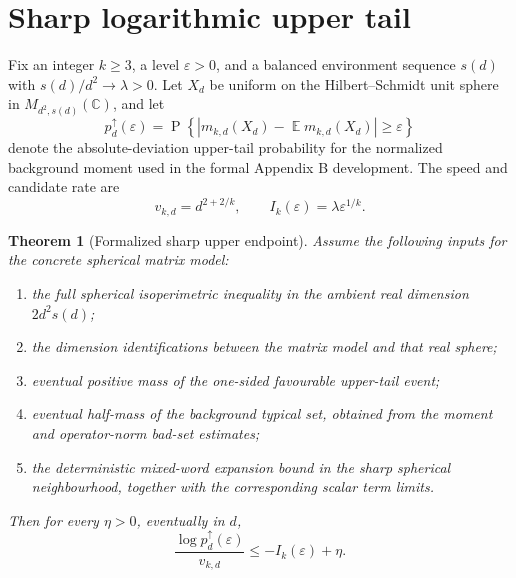 \documentclass[11pt,reqno]{amsart}
\newtheorem{theorem}{Theorem}[section]
\def\C{\mathbb{C}}
\DeclareMathOperator{\E}{\mathbb{E}}
\DeclareMathOperator{\Prob}{P}
\newenvironment{revverified}{\begingroup\color{RevisionVerified}}{\endgroup}
\begin{document}
\begin{revverified}
\section{Sharp logarithmic upper tail}
\label{sec:sharp-log-upper-tail}

Fix an integer \(k\ge3\), a level \(\varepsilon>0\), and a balanced
environment sequence \(s(d)\) with \(s(d)/d^2\to\lambda>0\).  Let \(X_d\) be
uniform on the Hilbert--Schmidt unit sphere in \(M_{d^2,s(d)}(\C)\), and let
\[
  p_d^\uparrow(\varepsilon)
  =
  \Prob\left\{
    \left|
      m_{k,d}(X_d)-\E m_{k,d}(X_d)
    \right|\ge \varepsilon
  \right\}
\]
denote the absolute-deviation upper-tail probability for the normalized
background moment used in the formal Appendix B development.  The speed and
candidate rate are
\[
  v_{k,d}=d^{2+2/k},
  \qquad
  I_k(\varepsilon)=\lambda\varepsilon^{1/k}.
\]

\begin{theorem}[Formalized sharp upper endpoint]
\label{thm:sharp-upper-endpoint}
Assume the following inputs for the concrete spherical matrix model:
\begin{enumerate}[leftmargin=*]
\item the full spherical isoperimetric inequality in the ambient real
  dimension \(2d^2s(d)\);
\item the dimension identifications between the matrix model and that real
  sphere;
\item eventual positive mass of the one-sided favourable upper-tail event;
\item eventual half-mass of the background typical set, obtained from the
  moment and operator-norm bad-set estimates;
\item the deterministic mixed-word expansion bound in the sharp spherical
  neighbourhood, together with the corresponding scalar term limits.
\end{enumerate}
Then for every \(\eta>0\), eventually in \(d\),
\[
  \frac{\log p_d^\uparrow(\varepsilon)}{v_{k,d}}
  \le
  -I_k(\varepsilon)+\eta .
\]
\end{theorem}
\end{revverified}
\end{document}
